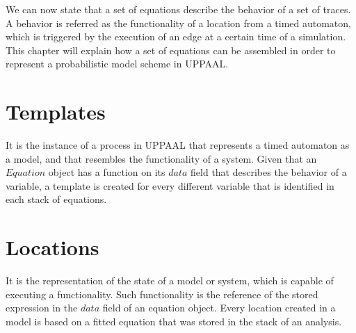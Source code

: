 We can now state that a set of
equations describe the behavior of a set of traces. 
%
A behavior is referred as the functionality of a location from a timed automaton, which is triggered by the execution of an edge at a certain time of a simulation. 
%
%
This chapter will explain how a set of equations can be
assembled in order to represent a probabilistic model scheme in UPPAAL.  


\section{Templates}
It is the instance of a process in UPPAAL that represents a timed automaton as a model, and that resembles the functionality of a system.
%
Given that an $Equation$ object has a function on its $data$ field that describes the behavior of a variable, a template is created for every different variable that is identified in each stack of equations. 
%
%

\section{Locations}
It is the representation of the state of a model or system, which is capable of executing a functionality. 
%
Such functionality is the reference of the stored expression in the $data$ field of an equation object.
%
Every location created in a model is based on a fitted equation that was stored in the stack of an analysis. 
%


